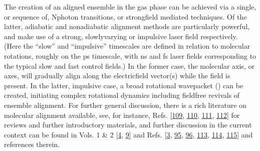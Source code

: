 \documentclass[letterpaper,table,10pt,english]{jupyterBook}
\begin{document}
\sphinxAtStartPar
The creation of an aligned ensemble in the gas phase can be achieved via a single, or sequence of, N\sphinxhyphen{}photon transitions, or strong\sphinxhyphen{}field mediated techniques. Of the latter, adiabatic and non\sphinxhyphen{}adiabatic alignment methods are particularly powerful, and make use of a strong, slowly\sphinxhyphen{}varying or impulsive laser field respectively. (Here the “slow” and “impulsive” time\sphinxhyphen{}scales are defined in relation to molecular rotations, roughly on the ps time\sphinxhyphen{}scale, with ns and fs laser fields corresponding to the typical slow and fast control fields.) In the former case, the molecular axis, or axes, will gradually align along the electric\sphinxhyphen{}field vector(s) while the field is present. In the latter, impulsive case, a broad rotational wavepacket ({\hyperref[\detokenize{backmatter/glossary:term-RWP}]{}}) can be created, initiating complex rotational dynamics including field\sphinxhyphen{}free revivals of ensemble alignment. For further general discussion, there is a rich literature on molecular alignment available, see, for instance, Refs. {[}\hyperlink{cite.backmatter/bibliography:id903}{109}, \hyperlink{cite.backmatter/bibliography:id645}{110}, \hyperlink{cite.backmatter/bibliography:id728}{111}, \hyperlink{cite.backmatter/bibliography:id1002}{112}{]} for reviews and further introductory materials, and further discussion in the current context can be found in  Vols. 1 \& 2 {[}\hyperlink{cite.backmatter/bibliography:id677}{4}, \hyperlink{cite.backmatter/bibliography:id678}{9}{]} and Refs. {[}\hyperlink{cite.backmatter/bibliography:id686}{3}, \hyperlink{cite.backmatter/bibliography:id841}{95}, \hyperlink{cite.backmatter/bibliography:id937}{96}, \hyperlink{cite.backmatter/bibliography:id835}{113}, \hyperlink{cite.backmatter/bibliography:id836}{114}, \hyperlink{cite.backmatter/bibliography:id664}{115}{]} and references therein.
\end{document}
